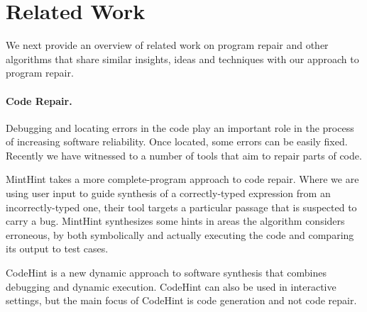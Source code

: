 \section{Related Work}
\label{sec:related}

We next provide an overview of related work on program repair and other algorithms
that share similar insights, ideas and techniques with our approach to program repair.

\paragraph{{\bf Code Repair.}} 
Debugging and locating errors in the code \cite{Pavlinovic:2014, Chandra:2011:AD} play 
an important role in the process of increasing software reliability. Once located, 
some errors can be easily fixed. Recently we have witnessed to a number of tools that 
aim to repair parts of code. 

MintHint \citep{MintHint} takes a more complete-program approach to code repair. Where we are using user input to guide synthesis of a correctly-typed expression from an incorrectly-typed one, their tool targets a particular passage that is suspected to carry a bug. MintHint synthesizes some hints in areas the algorithm considers erroneous, by both symbolically and actually executing the code and comparing its output to test cases.

CodeHint \cite{CodeHint2014ICSE} is a new dynamic approach to software synthesis 
that combines debugging and dynamic execution. CodeHint can also be used in 
interactive settings, but the main focus of CodeHint is code generation and not code repair.

